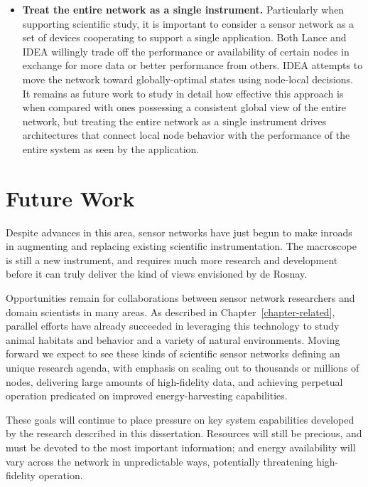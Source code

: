 \begin{itemize}
\item \textbf{Treat the entire network as a single instrument.} Particularly
when supporting scientific study, it is important to consider a sensor
network as a set of devices cooperating to support a single application. Both
Lance and IDEA willingly trade off the performance or availability of certain
nodes in exchange for more data or better performance from others. IDEA
attempts to move the network toward globally-optimal states using node-local
decisions. It remains as future work to study in detail how effective this
approach is when compared with ones possessing a consistent global view of
the entire network, but treating the entire network as a single instrument
drives architectures that connect local node behavior with the performance of
the entire system as seen by the application.

\end{itemize}

\section{Future Work}

Despite advances in this area, sensor networks have just begun to make
inroads in augmenting and replacing existing scientific instrumentation. The
macroscope is still a new instrument, and requires much more research and
development before it can truly deliver the kind of views envisioned by de
Rosnay.

Opportunities remain for collaborations between sensor network researchers
and domain scientists in many areas. As described in
Chapter~\ref{chapter-related}, parallel efforts have already succeeded in
leveraging this technology to study animal habitats and behavior and a
variety of natural environments. Moving forward we expect to see these kinds
of scientific sensor networks defining an unique research agenda, with
emphasis on scaling out to thousands or millions of nodes, delivering large
amounts of high-fidelity data, and achieving perpetual operation predicated
on improved energy-harvesting capabilities.

These goals will continue to place pressure on key system capabilities
developed by the research described in this dissertation. Resources will
still be precious, and must be devoted to the most important information; and
energy availability will vary across the network in unpredictable ways,
potentially threatening high-fidelity operation.

